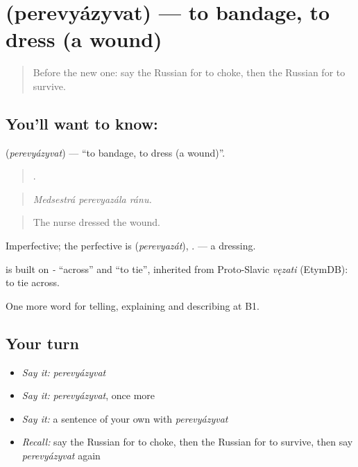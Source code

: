 \section[\texorpdfstring{\ru{перевязывать} (perevyázyvat)}{перевязывать (perevyázyvat)}]{ (perevyázyvat) — to bandage, to dress (a wound)}

\label{lesson:RU-C302-perevyazyvat}



\begin{quote}
Before the new one: say the Russian for to choke, then the Russian for to survive.
\end{quote}

\subsection*{You'll want to know: }
\textbf{} (\emph{perevyázyvat}) — \textquotedblleft{}to bandage, to dress (a wound)\textquotedblright{}.

\begin{quote}
  .
\end{quote}

\begin{quote}
\emph{Medsestrá perevyazála ránu.}
\end{quote}

\begin{quote}
The nurse dressed the wound.
\end{quote}

Imperfective; the perfective is \emph{} (\emph{perevyazát}), \emph{}. \emph{} — a dressing.

\begin{cousinweb}
\emph{} is built on \emph{-} \textquotedblleft{}across\textquotedblright{} and \emph{} \textquotedblleft{}to tie\textquotedblright{}, inherited from Proto-Slavic \emph{vęzati} (EtymDB): to tie across.
\end{cousinweb}

\begin{grammarlens}[title={What you've built}]
One more word for telling, explaining and describing at B1.
\end{grammarlens}

\subsection*{Your turn}
\begin{itemize}
\raggedright
  \item \emph{Say it:} \emph{perevyázyvat}
  \item \emph{Say it:} \emph{perevyázyvat}, once more
  \item \emph{Say it:} a sentence of your own with \emph{perevyázyvat}
  \item \emph{Recall:} say the Russian for to choke, then the Russian for to survive, then say \emph{perevyázyvat} again
\end{itemize}

